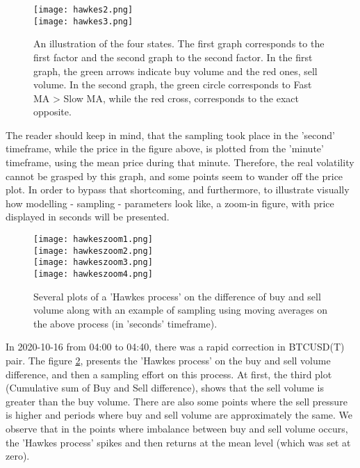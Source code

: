 \begin{figure}[H]
	\centering
    \texttt{[image: hawkes2.png]} \\
    \texttt{[image: hawkes3.png]} \\
	\caption{An illustration of the four states. The first graph corresponds to the first factor and the second graph to the second factor. In the first graph, the green arrows indicate buy volume and the red ones, sell volume. In the second graph, the green circle corresponds to Fast MA > Slow MA, while the red cross, corresponds to the exact opposite.}
    \label{fig:hawkes2}
\end{figure}


The reader should keep in mind, that the sampling took place in the 'second' timeframe, while the price in the figure above, is plotted from the 'minute' timeframe, using the mean price during that minute. Therefore, the real volatility cannot be grasped by this graph, and some points seem to wander off the price plot. In order to bypass that shortcoming, and furthermore, to illustrate visually how modelling - sampling - parameters look like, a zoom-in figure, with price displayed in seconds will be presented.


\begin{figure}[H]
	\centering
    \texttt{[image: hawkeszoom1.png]} \\
    \texttt{[image: hawkeszoom2.png]} \\
    \texttt{[image: hawkeszoom3.png]} \\
    \texttt{[image: hawkeszoom4.png]}
	\caption{Several plots of a 'Hawkes process' on the difference of buy and sell volume along with an example of sampling using moving averages on the above process (in 'seconds' timeframe).}
    \label{fig:hawkeszoom}
\end{figure}


In 2020-10-16 from 04:00 to 04:40, there was a rapid correction in BTCUSD(T) pair. The figure \ref{fig:hawkeszoom}, presents the 'Hawkes process' on the buy and sell volume difference, and then a sampling effort on this process. At first, the third plot (Cumulative sum of Buy and Sell difference), shows that the sell volume is greater than the buy volume. There are also some points where the sell pressure is higher and periods where buy and sell volume are approximately the same. We observe that in the points where imbalance between buy and sell volume occurs, the 'Hawkes process' spikes and then returns at the mean level (which was set at zero). 

